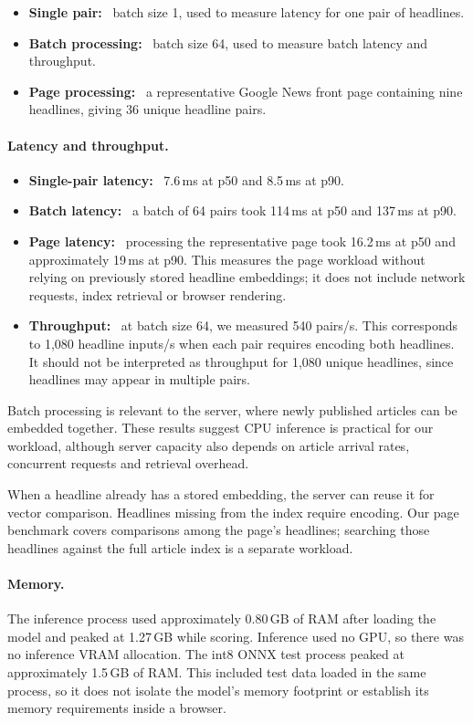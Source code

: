 \documentclass[11pt,letterpaper]{article}
\newcommand{\lead}[1]{\textbf{#1}~}
\begin{document}
\begin{itemize}
\item \lead{Single pair:} batch size 1, used to measure latency for one pair of headlines.
\item \lead{Batch processing:} batch size 64, used to measure batch latency and throughput.
\item \lead{Page processing:} a representative Google News front page containing nine headlines, giving 36 unique headline pairs.
\end{itemize}

\paragraph{Latency and throughput.}
\begin{itemize}
\item \lead{Single-pair latency:} 7.6\,ms at p50 and 8.5\,ms at p90.
\item \lead{Batch latency:} a batch of 64 pairs took 114\,ms at p50 and 137\,ms at p90.
\item \lead{Page latency:} processing the representative page took 16.2\,ms at p50 and approximately 19\,ms at p90. This measures the page workload without relying on previously stored headline embeddings; it does not include network requests, index retrieval or browser rendering.
\item \lead{Throughput:} at batch size 64, we measured 540 pairs/s. This corresponds to 1,080 headline inputs/s when each pair requires encoding both headlines. It should not be interpreted as throughput for 1,080 unique headlines, since headlines may appear in multiple pairs.
\end{itemize}

Batch processing is relevant to the server, where newly published articles can be embedded together. These results suggest CPU inference is practical for our workload, although server capacity also depends on article arrival rates, concurrent requests and retrieval overhead.

When a headline already has a stored embedding, the server can reuse it for vector comparison. Headlines missing from the index require encoding. Our page benchmark covers comparisons among the page's headlines; searching those headlines against the full article index is a separate workload.

\paragraph{Memory.}
The inference process used approximately 0.80\,GB of RAM after loading the model and peaked at 1.27\,GB while scoring. Inference used no GPU, so there was no inference VRAM allocation. The int8 ONNX test process peaked at approximately 1.5\,GB of RAM. This included test data loaded in the same process, so it does not isolate the model's memory footprint or establish its memory requirements inside a browser.
\end{document}
